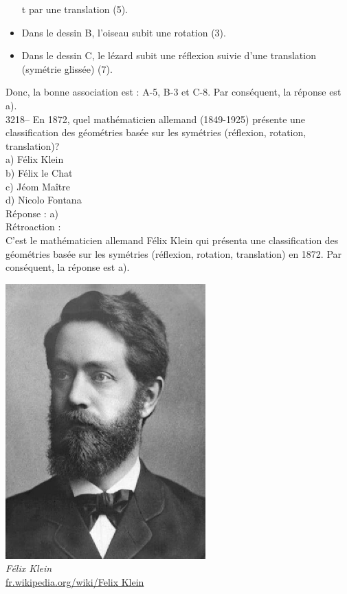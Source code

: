 \documentclass[letterpaper, 12pt]{article}
\begin{document}
\begin{itemize}
t par une translation (5).
\item Dans le dessin B, l'oiseau subit une rotation (3).
\item Dans le dessin C, le l\'ezard subit une r\'eflexion suivie d'une translation (sym\'etrie gliss\'ee) (7).
\end{itemize}
Donc, la bonne association est : A-5, B-3 et C-8. Par cons\'equent, la r\'eponse est a).\\



3218-- En 1872, quel math\'ematicien allemand (1849-1925) pr\'esente une classification des g\'eom\'etries bas\'ee sur les sym\'etries (r\'eflexion, rotation, translation)?\\

a) F\'elix Klein\\
b) F\'elix le Chat\\
c) J\'eom Ma\^itre\\
d) Nicolo Fontana\\

R\'eponse : a)\\

R\'etroaction :\\
C'est le math\'ematicien allemand F\'elix Klein qui pr\'esenta une classification des g\'eom\'etries bas\'ee sur les sym\'etries (r\'eflexion, rotation, translation) en 1872. Par cons\'equent, la r\'eponse est a).
\begin{center}
\includegraphics[scale=0.75]{klein.eps}\\
\emph{{\small F\'elix Klein}}\\
\href{http://fr.wikipedia.org/wiki/Felix_Klein}{fr.wikipedia.org/wiki/Felix Klein}\\[5mm]
\end{center}
\end{document}
